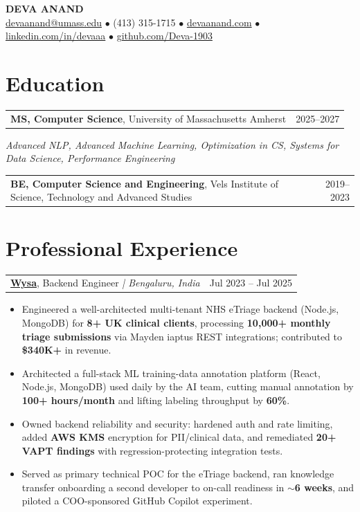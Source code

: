 \documentclass[letterpaper,11pt]{article}
\makeatletter
\newcommand{\eduItem}[3]{%
  \begin{tabular*}{\textwidth}{@{}l@{\extracolsep{\fill}}r@{}}
    \textbf{#1}, #2 & #3 \\
  \end{tabular*}\par
}
\newcommand{\expItem}[4]{%
  \vspace{3pt}
  \begin{tabular*}{\textwidth}{@{}l@{\extracolsep{\fill}}r@{}}
    \textbf{#1}, #2 \textit{| #3} & #4 \\
  \end{tabular*}\par\vspace{-2pt}
}
\makeatother
\begin{document}
\begin{center}
    {\fontsize{18}{20}\selectfont\bfseries DEVA ANAND}\\ \vspace{3pt}
    {\small
    \href{mailto:devaanand@umass.edu}{devaanand@umass.edu}
    \enspace$\bullet$\enspace
    (413) 315-1715
    \enspace$\bullet$\enspace
    \href{https://devaanand.com}{devaanand.com}
    \enspace$\bullet$\enspace
    \href{https://linkedin.com/in/devaaa/}{linkedin.com/in/devaaa}
    \enspace$\bullet$\enspace
    \href{https://github.com/Deva-1903}{github.com/Deva-1903}}
\end{center}
\vspace{-6pt}

\section{Education}
\eduItem{MS, Computer Science}{University of Massachusetts Amherst}{2025--2027}
{\small\textit{Advanced NLP, Advanced Machine Learning, Optimization in CS, Systems for Data Science, Performance Engineering}}\par
\vspace{3pt}
\eduItem{BE, Computer Science and Engineering}{Vels Institute of Science, Technology and Advanced Studies}{2019--2023}

\section{Professional Experience}

\expItem{\href{https://www.wysa.io}{Wysa}}{Backend Engineer}{Bengaluru, India}{Jul 2023 -- Jul 2025}
\begin{itemize}
  \item Engineered a well-architected multi-tenant NHS eTriage backend (Node.js, MongoDB) for \textbf{8+ UK clinical clients}, processing \textbf{10{,}000+ monthly triage submissions} via Mayden iaptus REST integrations; contributed to \textbf{\$340K+} in revenue.
  \item Architected a full-stack ML training-data annotation platform (React, Node.js, MongoDB) used daily by the AI team, cutting manual annotation by \textbf{100+ hours/month} and lifting labeling throughput by \textbf{60\%}.
  \item Owned backend reliability and security: hardened auth and rate limiting, added \textbf{AWS KMS} encryption for PII/clinical data, and remediated \textbf{20+ VAPT findings} with regression-protecting integration tests.
  \item Served as primary technical POC for the eTriage backend, ran knowledge transfer onboarding a second developer to on-call readiness in \textbf{$\sim$6 weeks}, and piloted a COO-sponsored GitHub Copilot experiment.
\end{itemize}
\end{document}
